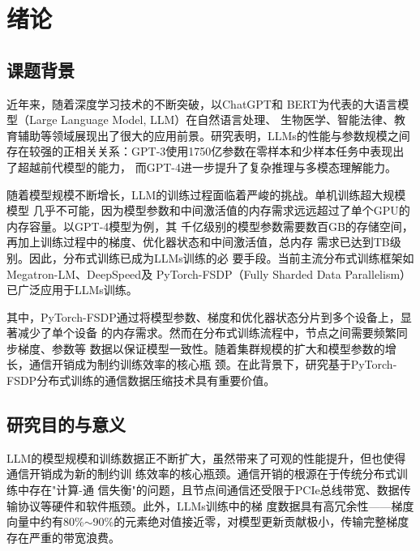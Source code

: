 
\chapter{绪论}

\section{课题背景}

近年来，随着深度学习技术的不断突破，以ChatGPT\cite{brown2020language}和
BERT\cite{devlin2019bert}为代表的大语言模型（Large Language Model, LLM）在自然语言处理、
生物医学、智能法律、教育辅助等领域展现出了很大的应用前景。研究表明，LLMs的性能与参数规模之间
存在较强的正相关关系：GPT-3使用1750亿参数在零样本和少样本任务中表现出了超越前代模型的能力\cite{brown2020language}，
而GPT-4进一步提升了复杂推理与多模态理解能力\cite{openai2023gpt4}。

随着模型规模不断增长，LLM的训练过程面临着严峻的挑战。单机训练超大规模模型
几乎不可能，因为模型参数和中间激活值的内存需求远远超过了单个GPU的内存容量。以GPT-4模型为例，其
千亿级别的模型参数需要数百GB的存储空间，再加上训练过程中的梯度、优化器状态和中间激活值，总内存
需求已达到TB级别。因此，分布式训练已成为LLMs训练的必
要手段\cite{li2014scaling,gibiansky2017allreduce}。当前主流分布式训练框架如
Megatron-LM\cite{narayanan2021efficient}、DeepSpeed\cite{rasley2020deepspeed}及
PyTorch-FSDP（Fully Sharded Data Parallelism）\cite{zhao2023fsdp}已广泛应用于LLMs训练。

其中，PyTorch-FSDP通过将模型参数、梯度和优化器状态分片到多个设备上，显著减少了单个设备
的内存需求\cite{zhao2023fsdp}。然而在分布式训练流程中，节点之间需要频繁同步梯度、参数等
数据以保证模型一致性。随着集群规模的扩大和模型参数的增长，通信开销成为制约训练效率的核心瓶
颈。在此背景下，研究基于PyTorch-FSDP分布式训练的通信数据压缩技术具有重要价值。

\section{研究目的与意义}

LLM的模型规模和训练数据正不断扩大，虽然带来了可观的性能提升，但也使得通信开销成为新的制约训
练效率的核心瓶颈\cite{wang2023compression}。通信开销的根源在于传统分布式训练中存在"计算-通
信失衡"的问题，且节点间通信还受限于PCIe总线带宽、数据传输协议等硬件和软件瓶颈。此外，LLMs训练中的梯
度数据具有高冗余性——梯度向量中约有80\%$\sim$90\%的元素绝对值接近零，对模型更新贡献极小，传输完整梯度
存在严重的带宽浪费。

